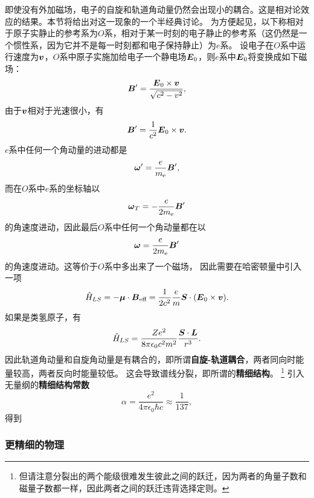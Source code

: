 \documentclass[UTF8, a4paper]{ctexart}
\begin{document}
即使没有外加磁场，电子的自旋和轨道角动量仍然会出现小的耦合。这是相对论效应的结果。本节将给出对这一现象的一个半经典讨论。
为方便起见，以下称相对于原子实静止的参考系为$O$系，相对于某一时刻的电子静止的参考系（这仍然是一个惯性系，因为它并不是每一时刻都和电子保持静止）为$e$系。
设电子在$O$系中运行速度为$\vb*{v}$，$O$系中原子实施加给电子一个静电场$\vb*{E}_0$，则$e$系中$\vb*{E}_0$将变换成如下磁场：
\[
    \vb*{B}' = \frac{\vb*{E}_0 \times \vb*{v}}{\sqrt{c^2 - v^2}},
\]
由于$\vb*{v}$相对于光速很小，有
\begin{equation}
    \vb*{B}' = \frac{1}{c^2} \vb*{E}_0 \times \vb*{v}.
\end{equation}
$e$系中任何一个角动量的进动都是%
\[
    \vb*{\omega}' = \frac{e}{m_\text{e}} \vb*{B}',
\]
而在$O$系中$e$系的坐标轴以
\[
    \vb*{\omega}_T = - \frac{e}{2 m_\text{e}} \vb*{B}'
\]
的角速度进动，因此最后$O$系中任何一个角动量都在以
\begin{equation}
    \vb*{\omega} = \frac{e}{2 m_\text{e}} \vb*{B}'
\end{equation}
的角速度进动。这等价于$O$系中多出来了一个磁场，%
因此需要在哈密顿量中引入一项
\begin{equation}
    \hat{H}_{LS} = - \vb*{\mu} \cdot \vb*{B}_\text{eff} = \frac{1}{2c^2} \frac{e}{m} \vb*{S} \cdot (\vb*{E}_0 \times \vb*{v}).
\end{equation}
如果是类氢原子，有
\begin{equation}
    \hat{H}_{LS} = \frac{Ze^2}{8 \pi \epsilon_0 c^2 m^2} \frac{\vb*{S} \cdot \vb*{L}}{r^3}.
    \label{eq:spin-ortibal-coupling}
\end{equation}
因此轨道角动量和自旋角动量是有耦合的，即所谓\textbf{自旋-轨道耦合}，两者同向时能量较高，两者反向时能量较低。
这会导致谱线分裂，即所谓的\textbf{精细结构}。%
\footnote{但请注意分裂出的两个能级很难发生彼此之间的跃迁，因为两者的角量子数和磁量子数都一样，因此两者之间的跃迁违背选择定则。}%
引入无量纲的\textbf{精细结构常数}
\begin{equation}
    \alpha = \frac{e^2}{4\pi \epsilon_0 \hbar c} \approx \frac{1}{137},
\end{equation}
得到%

\subsubsection{更精细的物理}

\end{document}
